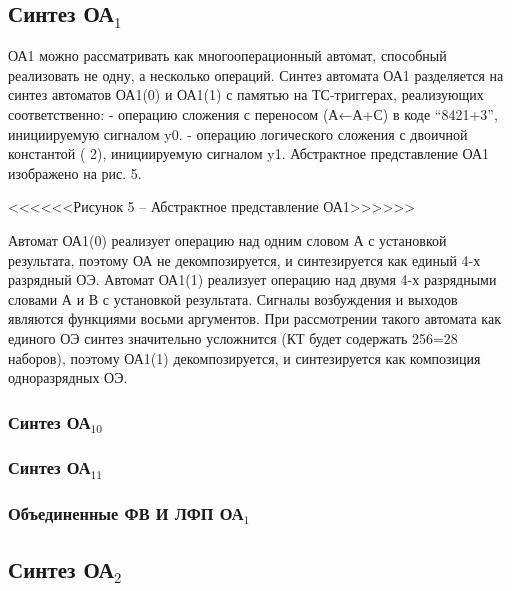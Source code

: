\subsection{Синтез ОА${}_1$}


ОА1 можно рассматривать как многооперационный автомат, способный реализовать не одну, а несколько операций. Синтез автомата ОА1 разделяется на синтез автоматов ОА1(0) и ОА1(1)  с памятью на ТС-триггерах, реализующих соответственно: 
- операцию сложения с переносом (А←А+С) в коде “8421+3”, инициируемую сигналом y0.
- операцию логического сложения с двоичной константой ( 2), инициируемую сигналом y1.
Абстрактное представление ОА1 изображено на рис. 5.

<<<<<<Рисунок 5 –  Абстрактное представление ОА1>>>>>>

Автомат ОА1(0) реализует операцию над одним словом А с установкой результата, поэтому ОА не декомпозируется, и синтезируется как единый 4-х разрядный ОЭ.
Автомат ОА1(1) реализует операцию над двумя 4-х разрядными словами А и В с установкой результата. Сигналы возбуждения и выходов являются функциями восьми аргументов. При рассмотрении такого автомата как единого ОЭ синтез значительно усложнится (КТ будет содержать 256=28 наборов), поэтому ОА1(1)  декомпозируется, и синтезируется как композиция одноразрядных ОЭ.


\subsubsection{Синтез ОА${}_{10}$}






\subsubsection{Синтез ОА${}_{11}$}



\subsubsection{Объединенные ФВ И ЛФП ОА${}_1$}

\subsection{Синтез ОА${}_2$}
